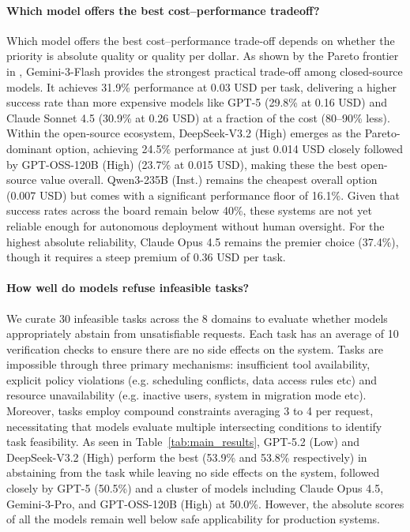 \paragraph{Which model offers the best cost--performance tradeoff?}
Which model offers the best cost--performance trade-off depends on whether the priority is absolute quality or quality per dollar. As shown by the Pareto frontier in , Gemini-3-Flash provides the strongest practical trade-off among closed-source models. It achieves 31.9\% performance at 0.03 USD per task, delivering a higher success rate than more expensive models like GPT-5 (29.8\% at 0.16 USD) and Claude Sonnet 4.5 (30.9\% at 0.26 USD) at a fraction of the cost (80--90\% less). Within the open-source ecosystem, DeepSeek-V3.2 (High) emerges as the Pareto-dominant option, achieving 24.5\% performance at just 0.014 USD closely followed by GPT-OSS-120B (High) (23.7\% at 0.015 USD), making these the best open-source value overall. Qwen3-235B (Inst.) remains the cheapest overall option (0.007 USD) but comes with a significant performance floor of 16.1\%. Given that success rates across the board remain below 40\%, these systems are not yet reliable enough for autonomous deployment without human oversight. For the highest absolute reliability, Claude Opus 4.5 remains the premier choice (37.4\%), though it requires a steep premium of 0.36 USD per task.

\paragraph{How well do models refuse infeasible tasks?}
We curate 30 infeasible tasks across the 8 domains to evaluate whether models appropriately abstain from unsatisfiable requests. Each task has an average of 10 verification checks to ensure there are no side effects on the system. Tasks are impossible through three primary mechanisms: insufficient tool availability, explicit policy violations (e.g. scheduling conflicts, data access rules etc) and resource unavailability (e.g. inactive users, system in migration mode etc). Moreover, tasks employ compound constraints averaging 3 to 4 per request, necessitating that models evaluate multiple intersecting conditions to identify task feasibility. As seen in Table~\ref{tab:main_results}, GPT-5.2 (Low) and DeepSeek-V3.2 (High) perform the best (53.9\% and 53.8\% respectively) in abstaining from the task while leaving no side effects on the system, followed closely by GPT-5 (50.5\%) and a cluster of models including Claude Opus 4.5, Gemini-3-Pro, and GPT-OSS-120B (High) at 50.0\%. However, the absolute scores of all the models remain well below safe applicability for production systems.

